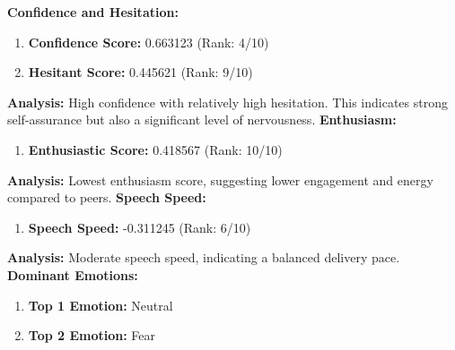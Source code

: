 \documentclass{article}
\begin{document}
\vspace{0.1in}
\large{\textbf{Confidence and Hesitation:}}
\begin{tcolorbox}[title=Confidence and Hesitant Scores]
    \begin{enumerate}
        \item \textbf{Confidence Score:} \textcolor{green!50!black}{0.663123} (Rank: 4/10)
        \item \textbf{Hesitant Score:} \textcolor{red!70!black}{0.445621} (Rank: 9/10)
    \end{enumerate}
\end{tcolorbox}
    \textbf{Analysis:} High confidence with relatively high hesitation. This indicates strong self-assurance but also a significant level of nervousness.
    \vspace{0.1in}
\large{\textbf{Enthusiasm:}}
\begin{tcolorbox}[ colback=purple!5!white,colframe=purple!75!black,  title=Enthusiastic Score]
    \begin{enumerate}
        \item \textbf{Enthusiastic Score:} \textcolor{orange!70!black}{0.418567} (Rank: 10/10)
    \end{enumerate}
\end{tcolorbox}
    \textbf{Analysis:} Lowest enthusiasm score, suggesting lower engagement and energy compared to peers.
    \vspace{0.1in}
\large{\textbf{Speech Speed:}}
\begin{tcolorbox}[title=Speech Speed]
    \begin{enumerate}
        \item \textbf{Speech Speed:} \textcolor{purple!70!black}{-0.311245} (Rank: 6/10)
    \end{enumerate}
\end{tcolorbox}
    \textbf{Analysis:} Moderate speech speed, indicating a balanced delivery pace.
    \vspace{0.1in}
\large{\textbf{Dominant Emotions:}}
\begin{tcolorbox}[colback=cyan!5!white,colframe=cyan!75!black,title=Emotional State]
    \begin{enumerate}
        \item \textbf{Top 1 Emotion:} \textcolor{blue!80!black}{Neutral}
        \item \textbf{Top 2 Emotion:} \textcolor{red!80!black}{Fear}
    \end{enumerate}
\end{tcolorbox}
\end{document}
